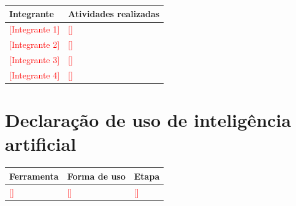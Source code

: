 \documentclass[
  12pt,
  oneside,
  a4paper,
  chapter=TITLE,
  section=TITLE,
  english,
  brazil
]{abntex2}
\newcommand{\preencher}[1]{\textcolor{red}{[#1]}}
\begin{document}
\begin{quadro}[htbp]
  \caption{Contribuição individual}\label{qua:contribuicao}
  \centering\small
  \begin{tabularx}{\textwidth}{|l|X|}\hline
    \textbf{Integrante} & \textbf{Atividades realizadas} \\\hline
    \preencher{Integrante 1} & \preencher{} \\\hline
    \preencher{Integrante 2} & \preencher{} \\\hline
    \preencher{Integrante 3} & \preencher{} \\\hline
    \preencher{Integrante 4} & \preencher{} \\\hline
  \end{tabularx}
\end{quadro}

\chapter{Declaração de uso de inteligência artificial}\label{cap:ia}

\begin{quadro}[htbp]
  \caption{Uso de inteligência artificial}\label{qua:ia}
  \centering\small
  \begin{tabularx}{\textwidth}{|l|X|l|}\hline
    \textbf{Ferramenta} & \textbf{Forma de uso} & \textbf{Etapa} \\\hline
    \preencher{} & \preencher{} & \preencher{} \\\hline
  \end{tabularx}
\end{quadro}

\postextual


\end{document}
